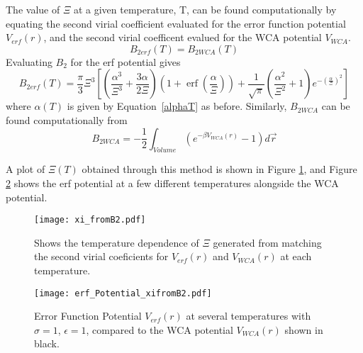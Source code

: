 \documentclass[12pt]{article}
\begin{document}
The value of $\Xi$ at a given temperature, T, can be found computationally by equating the second virial coefficient evaluated for the error function potential $V_{erf}(r)$, and the second virial coefficent evalued for the WCA potential $V_{WCA}$.
\begin{equation}B_{2erf}(T) =B_{2WCA}(T)\end{equation}
Evaluating $B_{2}$ for the erf potential gives
\begin{equation}
	B_{2erf}(T) = \frac{\pi}{3}\Xi^3\left[\left(\frac{\alpha^3}{\Xi^3}+\frac{3\alpha}{2\Xi}\right)\left(1+\operatorname{erf}\left(\frac{\alpha}{\Xi}\right)\right)+\frac{1}{\sqrt{\pi}}\left(\frac{\alpha^2}{\Xi^2}+1\right)e^{-\left(\frac{\alpha}{\Xi}\right)^2}\right]
\end{equation}
where $\alpha(T)$ is given by Equation~\ref{alphaT} as before. Similarly, $B_{2WCA}$ can be found computationally from 
\begin{equation}
	B_{2WCA}=-\frac{1}{2}\int_{Volume}\left(e^{-\beta{V}_{WCA}(r)}-1\right)d\vec{r} 
\end{equation}
 
A plot of $\Xi(T)$ obtained through this method is shown in Figure \ref{fig:xi_fromB2vsT}, and Figure \ref{fig:erf_Potential_xifromB2} shows the erf potential at a few different temperatures alongside the WCA potential. 

\begin{figure}[h!]
    \centering
    \texttt{[image: xi\_fromB2.pdf]}
    \caption{Shows the temperature dependence of $\Xi$ generated from matching the second virial coeficients for $V_{erf}(r)$ and $V_{WCA}(r)$ at each temperature.}
    \label{fig:xi_fromB2vsT}
  \end{figure}


\begin{figure}[h!]
    \centering
    \texttt{[image: erf\_Potential\_xifromB2.pdf]}
    \caption{Error Function Potential $V_{erf}(r)$ at several temperatures with $\sigma=1$, $\epsilon=1$, compared to the WCA potential $V_{WCA}(r)$ shown in black.}
    \label{fig:erf_Potential_xifromB2}
  \end{figure}


\end{document}
